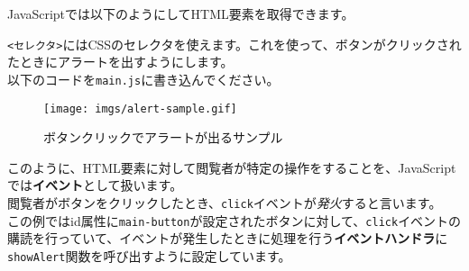 JavaScriptでは以下のようにしてHTML要素を取得できます。

\begin{Shaded}
\begin{Highlighting}[]
\NormalTok{(}\NormalTok{)}
\end{Highlighting}
\end{Shaded}

\texttt{\textless{}セレクタ\textgreater{}}にはCSSのセレクタを使えます。これを使って、ボタンがクリックされたときにアラートを出すようにします。\\
以下のコードを\texttt{main.js}に書き込んでください。

\begin{Shaded}
\begin{Highlighting}[]
\OperatorTok{=} \NormalTok{(}\NormalTok{)}\OperatorTok{;}

\OperatorTok{=} \NormalTok{ () \{}
  \NormalTok{(}\NormalTok{)}\OperatorTok{;}
\NormalTok{\}}

\NormalTok{(}\OperatorTok{,}\OperatorTok{;}
\end{Highlighting}
\end{Shaded}

\begin{figure}
\centering
\texttt{[image: imgs/alert-sample.gif]}
\caption{ボタンクリックでアラートが出るサンプル}
\end{figure}

このように、HTML要素に対して閲覧者が特定の操作をすることを、JavaScriptでは\textbf{イベント}として扱います。\\
閲覧者がボタンをクリックしたとき、\texttt{\textquotesingle{}click\textquotesingle{}}イベントが\emph{発火}すると言います。\\
この例ではid属性に\texttt{main-button}が設定されたボタンに対して、\texttt{\textquotesingle{}click\textquotesingle{}}イベントの購読を行っていて、イベントが発生したときに処理を行う\textbf{イベントハンドラ}に\texttt{showAlert}関数を呼び出すように設定しています。

